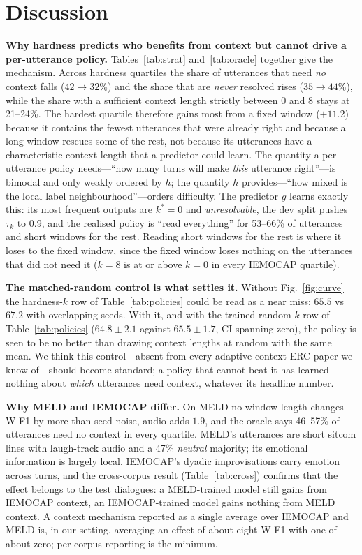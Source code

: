 \documentclass[journal]{IEEEtran}
\newcommand{\wf}{W-F1}
\begin{document}
\section{Discussion}\label{sec:discussion}
\textbf{Why hardness predicts who benefits from context but cannot drive a per-utterance policy.} Tables~\ref{tab:strat} and~\ref{tab:oracle} together give the mechanism. Across hardness quartiles the share of utterances that need \emph{no} context falls ($42 \rightarrow 32\%$) and the share that are \emph{never} resolved rises ($35 \rightarrow 44\%$), while the share with a sufficient context length strictly between 0 and 8 stays at 21--24\%. The hardest quartile therefore gains most from a fixed window ($+11.2$) because it contains the fewest utterances that were already right and because a long window rescues some of the rest, not because its utterances have a characteristic context length that a predictor could learn. The quantity a per-utterance policy needs---``how many turns will make \emph{this} utterance right''---is bimodal and only weakly ordered by $h$; the quantity $h$ provides---``how mixed is the local label neighbourhood''---orders difficulty. The predictor $g$ learns exactly this: its most frequent outputs are $k^*{=}0$ and \emph{unresolvable}, the dev split pushes $\tau_k$ to 0.9, and the realised policy is ``read everything'' for 53--66\% of utterances and short windows for the rest. Reading short windows for the rest is where it loses to the fixed window, since the fixed window loses nothing on the utterances that did not need it ($k = 8$ is at or above $k = 0$ in every IEMOCAP quartile).

\textbf{The matched-random control is what settles it.} Without Fig.~\ref{fig:curve} the hardness-$k$ row of Table~\ref{tab:policies} could be read as a near miss: $65.5$ vs $67.2$ with overlapping seeds. With it, and with the trained random-$k$ row of Table~\ref{tab:policies} ($64.8 \pm 2.1$ against $65.5 \pm 1.7$, CI spanning zero), the policy is seen to be no better than drawing context lengths at random with the same mean. We think this control---absent from every adaptive-context ERC paper we know of---should become standard; a policy that cannot beat it has learned nothing about \emph{which} utterances need context, whatever its headline number.

\textbf{Why MELD and IEMOCAP differ.} On MELD no window length changes \wf{} by more than seed noise, audio adds $1.9$, and the oracle says 46--57\% of utterances need no context in every quartile. MELD's utterances are short sitcom lines with laugh-track audio and a 47\% \emph{neutral} majority; its emotional information is largely local. IEMOCAP's dyadic improvisations carry emotion across turns, and the cross-corpus result (Table~\ref{tab:cross}) confirms that the effect belongs to the test dialogues: a MELD-trained model still gains from IEMOCAP context, an IEMOCAP-trained model gains nothing from MELD context. A context mechanism reported as a single average over IEMOCAP and MELD is, in our setting, averaging an effect of about eight \wf{} with one of about zero; per-corpus reporting is the minimum.
\end{document}
